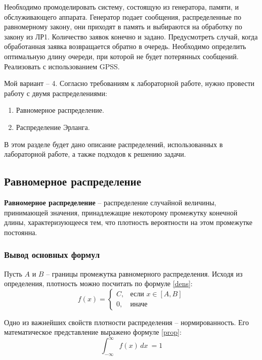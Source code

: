 Необходимо промоделировать систему, состоящую из генератора, памяти, и обслуживающего аппарата. Генератор подает сообщения, распределенные по равномерному закону, они приходят в память и выбираются на обработку по закону из ЛР1. Количество заявок конечно и задано. Предусмотреть случай, когда обработанная заявка возвращается обратно в очередь. Необходимо определить оптимальную длину очереди, при которой не будет потерянных сообщений. Реализовать с использованием GPSS.

Мой вариант -- 4.
Согласно требованиям к лабораторной работе, нужно провести работу с двумя распределениями:
\begin{enumerate}
	\item Равномерное распределение.
	\item Распределение Эрланга.
\end{enumerate}

В этом разделе будет дано описание распределений, использованных в лабораторной работе, а также подходов к решению задачи.

\subsection*{Равномерное распределение}
\textbf{Равномерное распределение} -- распределение случайной величины, принимающей значения, принадлежащие некоторому промежутку конечной длины, характеризующееся тем, что плотность вероятности на этом промежутке постоянна.


\subsubsection*{Вывод основных формул}
Пусть $A$ и $B$ -- границы промежутка равномерного распределения. Исходя из определения, плотность можно посчитать по формуле \ref{dens}:
\begin{equation}
	\label{dens}
	f(x)= 
	\begin{cases}
		C,& \text{если } x \in [A, B]\\
		0,              & \text{иначе}
	\end{cases}
\end{equation}

Одно из важнейших свойств плотности распределения -- нормированность. Его математическое представление выражено формуле \ref{prop}:
\begin{equation}
	\label{prop}
	\int_{-\infty}^{\infty} f(x) \,dx \ = 1
\end{equation}

